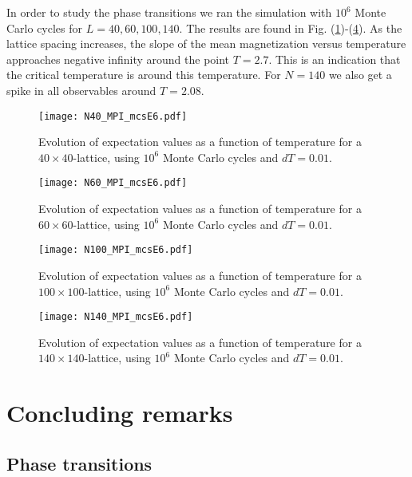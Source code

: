 \documentclass[11pt]{article}
\begin{document}
\begin{flushleft}
In order to study the phase transitions we ran the simulation with $10^6$ Monte Carlo cycles for $L=40,60,100,140$. The results are found in Fig. (\ref{fig::exp 40})-(\ref{fig::exp 140}). As the lattice spacing increases, the slope of the mean magnetization versus temperature approaches negative infinity around the point $T=2.7$. This is an indication that the critical temperature is around this temperature. For $N=140$ we also get a spike in all observables around $T=2.08$. 


\begin{figure}[H]
\centering
\texttt{[image: N40\_MPI\_mcsE6.pdf]}
\caption{Evolution of expectation values as a function of temperature for a $40 \times 40$-lattice, using $10^6$ Monte Carlo cycles and $dT=0.01$.}
\label{fig::exp 40}
\end{figure}

\begin{figure}[H]
\centering
\texttt{[image: N60\_MPI\_mcsE6.pdf]}
\caption{Evolution of expectation values as a function of temperature for a $60 \times 60$-lattice, using $10^6$ Monte Carlo cycles and $dT=0.01$.}
\label{fig::exp 60}
\end{figure}

\begin{figure}[H]
\centering
\texttt{[image: N100\_MPI\_mcsE6.pdf]}
\caption{Evolution of expectation values as a function of temperature for a $100 \times 100$-lattice, using $10^6$ Monte Carlo cycles and $dT=0.01$.}
\label{fig::exp 100}
\end{figure}

\begin{figure}[H]
\centering
\texttt{[image: N140\_MPI\_mcsE6.pdf]}
\caption{Evolution of expectation values as a function of temperature for a $140 \times 140$-lattice, using $10^6$ Monte Carlo cycles and $dT=0.01$.}
\label{fig::exp 140}
\end{figure}

\end{flushleft}

\section{Concluding remarks}

\subsection{Phase transitions}
\end{document}
